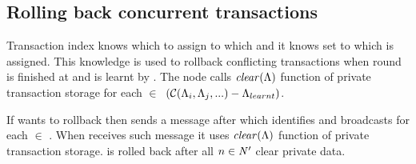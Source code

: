 \subsection{Rolling back concurrent transactions}
Transaction index knows which \paxosRoundId to assign to which \txState and it knows set \conflictingTxSet to which \txState is assigned. This knowledge is used to rollback conflicting transactions when \paxos round \paxosRoundId is finished at  and \txStateCommitted is learnt by . The node calls $\mathit{clear}(\text{$\Lambda$})$ function of private transaction storage for each \mbox{\txState $\in$ $(\text{$\mathcal{C}\text{$(\Lambda_{i}, \Lambda_{j}, ...)$}$} - \text{$\Lambda_{learnt}$})$}.

If \client wants to rollback \transaction then \client
sends a message \txRollbackMessage after which  identifies \nodesTx and broadcasts \rollbackMessage for each  $\in$ \nodesTx. When  receives such message it
uses $\mathit{clear}(\text{$\Lambda$})$ function of private transaction storage. \transaction is rolled back after all 
\mbox{$n\in \text{$\mathit{N'}$}$} clear private data.